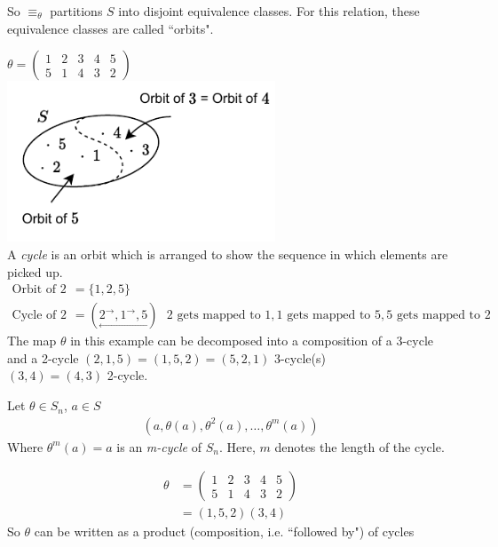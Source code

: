 So $\equiv_{\theta}$ partitions $S$ into disjoint equivalence classes. For this relation, these equivalence classes are called ``orbits".

\begin{example}
$\theta= \begin{pmatrix}
1&2&3&4&5 \\ 5&1&4&3&2
\end{pmatrix}$ \\
\includegraphics[width=0.6\textwidth]{Figures/Orbits_ex.pdf}\\
A \textit{cycle} is an orbit which is arranged to show the sequence in which  elements are picked up.
\begin{align}
    \text{Orbit of } 2 &= \{1,2,5\} \nonumber \\
    \text{Cycle of } 2 &= (\underset{\longleftarrow}{2^{\rightarrow},1^{\rightarrow},5}) \ \ \ 2 \text{ gets mapped to }1, 1 \text{ gets mapped to } 5, 5 \text{ gets mapped to } 2 \nonumber
\end{align}
The map $\theta$ in this example can be decomposed into a composition of a 3-cycle and a 2-cycle
$(2,1,5)=(1,5,2)=(5,2,1)$ 3-cycle(s) \\
$(3,4)=(4,3)$ 2-cycle.
\end{example}
\begin{definition}[m-cycle]
Let $\theta \in S_n$, $a\in S$\\
\begin{align}
    (a,\theta(a),\theta^2(a), \dots, \theta^m(a))\nonumber
\end{align}
Where $\theta^m(a)=a$ is an \textit{m-cycle} of $S_n$. Here, $m$ denotes the length of the cycle.
\end{definition}
\begin{example}

\begin{align}
\theta &= \begin{pmatrix}
1&2&3&4&5\\5&1&4&3&2
\end{pmatrix}  \nonumber \\
&= (1,5,2)(3,4) \nonumber
\end{align}
So $\theta$ can be written as a product (composition, i.e. ``followed by") of cycles
\end{example}
